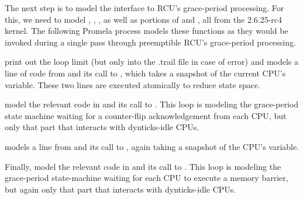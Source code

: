 The next step is to model the interface to RCU's grace-period
processing.
For this, we need to model
,
,
,
as well as portions of
 and
, all from the 2.6.25-rc4 kernel.
The following  Promela process models
these functions as they would be invoked during a single pass
through preemptible RCU's grace-period processing.



\begin{fcvref}
 print out the loop limit
(but only into the .trail file
in case of error) and models a line of code
from  and its call to
, which takes a
snapshot of the current CPU's 
variable.
These two lines are executed atomically to reduce state space.

 model the relevant code in
 and its call to
.
This loop is modeling the grace-period state machine waiting for
a counter-flip acknowledgement from each CPU, but only that part
that interacts with dynticks-idle CPUs.

 models a line from 
and its call to , again
taking a snapshot of the CPU's 
variable.

Finally,  model the relevant code in
 and its call to
.
This loop is modeling the grace-period state-machine waiting for
each CPU to execute a memory barrier, but again only that part
that interacts with dynticks-idle CPUs.
\end{fcvref}

\QuickQuizEnd

